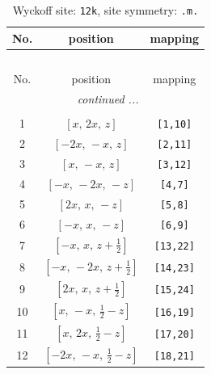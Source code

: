 \documentclass[fleqn,8pt]{jsarticle}
\begin{document}
\begin{longtable}{ccc}
\caption{Wyckoff site: {\tt 12k}, site symmetry: {\tt .m.}}
 \\
 \hline \hline
No. & position & mapping \\ \hline \endfirsthead

\multicolumn{2}{l}{\tablename\ \thetable{}} \\
 \hline \hline
No. & position & mapping \\ \hline \endhead

 \hline \hline
\multicolumn{2}{r}{\footnotesize\it continued ...} \\ \endfoot

 \hline \hline
\multicolumn{2}{r}{} \\ \endlastfoot

1 & $\left[ x,\, 2 x,\, z \right]$ & {\tt [1,10]} \\ \hline
2 & $\left[ - 2 x,\, - x,\, z \right]$ & {\tt [2,11]} \\ \hline
3 & $\left[ x,\, - x,\, z \right]$ & {\tt [3,12]} \\ \hline
4 & $\left[ - x,\, - 2 x,\, - z \right]$ & {\tt [4,7]} \\ \hline
5 & $\left[ 2 x,\, x,\, - z \right]$ & {\tt [5,8]} \\ \hline
6 & $\left[ - x,\, x,\, - z \right]$ & {\tt [6,9]} \\ \hline
7 & $\left[ - x,\, x,\, z + \frac{1}{2} \right]$ & {\tt [13,22]} \\ \hline
8 & $\left[ - x,\, - 2 x,\, z + \frac{1}{2} \right]$ & {\tt [14,23]} \\ \hline
9 & $\left[ 2 x,\, x,\, z + \frac{1}{2} \right]$ & {\tt [15,24]} \\ \hline
10 & $\left[ x,\, - x,\, \frac{1}{2} - z \right]$ & {\tt [16,19]} \\ \hline
11 & $\left[ x,\, 2 x,\, \frac{1}{2} - z \right]$ & {\tt [17,20]} \\ \hline
12 & $\left[ - 2 x,\, - x,\, \frac{1}{2} - z \right]$ & {\tt [18,21]} \\
\end{longtable}
\renewcommand{\arraystretch}{1.2}
\end{document}

